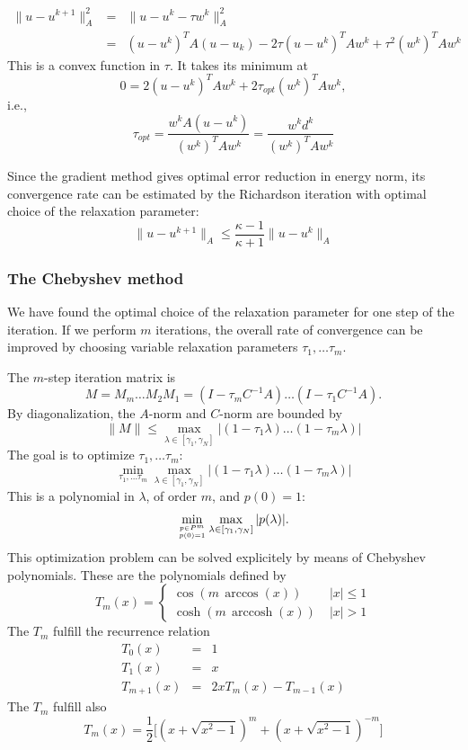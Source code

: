 \begin{eqnarray*}
\| u - u^{k+1} \|_A^2 & = & \| u - u^k - \tau w^k \|_A^2 \\
        & = & (u-u^k)^T A (u-u_k) - 2 \tau (u-u^k)^T A w^k + \tau^2 (w^k)^T A w^k
\end{eqnarray*}
This is a convex function in $\tau$. It takes its minimum at
$$
0 = 2 (u-u^k)^T A w^k + 2 \tau_{opt}  (w^k)^T A w^k,
$$
i.e., 
$$
\tau_{opt} = \frac{ w^k A (u-u^k) } { (w^k)^T A w^k } = \frac{w^k d^k}{(w^k)^T A w^k}
$$

Since the gradient method gives optimal error reduction in energy norm, its
convergence rate can be estimated by the Richardson iteration with optimal
choice of the relaxation parameter:
$$
\| u - u^{k+1} \|_A \leq \frac{\kappa-1}{\kappa+1} \| u - u^k \|_A
$$

\subsubsection{The Chebyshev method}
We have found the optimal choice of the relaxation parameter for one
step of the iteration. If we perform $m$ iterations, the overall rate of convergence
can be improved by choosing variable relaxation parameters $\tau_1, \ldots \tau_m$.

The $m$-step iteration matrix is 
$$
M = M_m \ldots M_2 M_1 = (I - \tau_m C^{-1} A) \ldots (I - \tau_1 C^{-1} A).
$$
By diagonalization, the $A$-norm and $C$-norm are bounded by
$$
\| M \| \leq
 \max_{\lambda \in [\gamma_1, \gamma_N]} | (1-\tau_1 \lambda) \ldots (1-\tau_m \lambda) |
$$
The goal is to optimize $\tau_1, \ldots \tau_m$:
$$
\min_{\tau_1, \ldots \tau_m}
 \max_{\lambda \in [\gamma_1, \gamma_N]} | (1-\tau_1 \lambda) \ldots (1-\tau_m \lambda) |
$$
This is a polynomial in $\lambda$, of order $m$, and $p(0) = 1$:
\begin{equation}
\label{equ_polopt}
\min_{p \in P^m \atop p(0) = 1}
 \max_{\lambda \in [\gamma_1, \gamma_N]} | p(\lambda) |.
\end{equation}
This optimization problem can be solved explicitely by means of Chebyshev
polynomials. These are the polynomials defined by
$$
T_m(x) = \left\{ \begin{array}{cl}
         \cos (m \, \arccos (x))  & \; | x | \leq 1 \\
        \cosh (m \, \operatorname{arccosh} (x)) & \; | x | > 1 
        \end{array}
        \right.
$$
The $T_m$ fulfill the recurrence relation
\begin{eqnarray*}
T_0(x) & = & 1 \\
T_1(x) & = & x \\
T_{m+1}(x) & = & 2 x T_m(x) - T_{m-1}(x)
\end{eqnarray*}
The $T_m$ fulfill also
$$
T_m(x) = \frac{1}{2} \Big[ (x + \sqrt{x^2-1})^m + (x+\sqrt{x^2-1})^{-m} \Big]
$$


